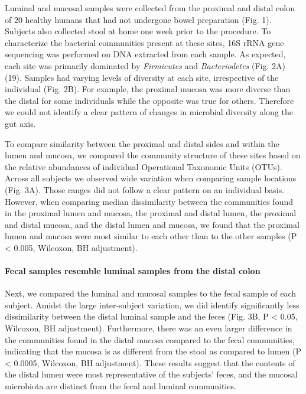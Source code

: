 \documentclass[12pt,]{article}
\let\oldparagraph\paragraph
\renewcommand{\paragraph}[1]{\oldparagraph{#1}\mbox{}}
\begin{document}
Luminal and mucosal samples were collected from the proximal and distal
colon of 20 healthy humans that had not undergone bowel preparation
(Fig. 1). Subjects also collected stool at home one week prior to the
procedure. To characterize the bacterial communities present at these
sites, 16S rRNA gene sequencing was performed on DNA extracted from each
sample. As expected, each site was primarily dominated by
\emph{Firmicutes} and \emph{Bacteriodetes} (Fig. 2A) (19). Samples had
varying levels of diversity at each site, irrespective of the individual
(Fig. 2B). For example, the proximal mucosa was more diverse than the
distal for some individuals while the opposite was true for others.
Therefore we could not identify a clear pattern of changes in microbial
diversity along the gut axis.

To compare similarity between the proximal and distal sides and within
the lumen and mucosa, we compared the community structure of these sites
based on the relative abundances of individual Operational Taxonomic
Units (OTUs). Across all subjects we observed wide variation when
comparing sample locations (Fig. 3A). Those ranges did not follow a
clear pattern on an individual basis. However, when comparing median
dissimilarity between the communities found in the proximal lumen and
mucosa, the proximal and distal lumen, the proximal and distal mucosa,
and the distal lumen and mucosa, we found that the proximal lumen and
mucosa were most similar to each other than to the other samples (P
\textless{} 0.005, Wilcoxon, BH adjustment).

\paragraph{Fecal samples resemble luminal samples from the distal
colon}\label{fecal-samples-resemble-luminal-samples-from-the-distal-colon}

Next, we compared the luminal and mucosal samples to the fecal sample of
each subject. Amidst the large inter-subject variation, we did identify
significantly less dissimilarity between the distal luminal sample and
the feces (Fig. 3B, P \textless{} 0.05, Wilcoxon, BH adjustment).
Furthermore, there was an even larger difference in the communities
found in the distal mucosa compared to the fecal communities, indicating
that the mucosa is as different from the stool as compared to lumen (P
\textless{} 0.0005, Wilcoxon, BH adjustment). These results suggest that
the contents of the distal lumen were most representative of the
subjects' feces, and the mucosal microbiota are distinct from the fecal
and luminal communities.
\end{document}
